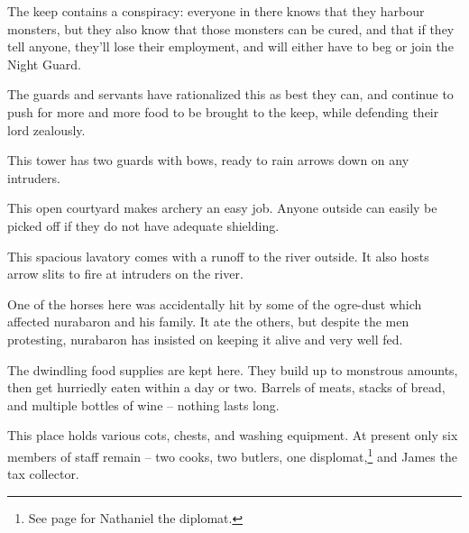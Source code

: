 \begin{multicols}{2}

\setcounter{list}{0}

The keep contains a conspiracy: everyone in there knows that they harbour monsters, but they also know that those monsters can be cured, and that if they tell anyone, they'll lose their employment, and will either have to beg or join the Night Guard.

The guards and servants have rationalized this as best they can, and continue to push for more and more food to be brought to the keep, while defending their lord zealously.


This tower has two guards with bows, ready to rain arrows down on any intruders.


\humanarcher


This open courtyard makes archery an easy job.  Anyone outside can easily be picked off if they do not have adequate shielding.


This spacious lavatory comes with a runoff to the river outside.  It also hosts arrow slits to fire at intruders on the river.


One of the horses here was accidentally hit by some of the ogre-dust which affected \gls{nurabaron} and his family.  It ate the others, but despite the men protesting, \gls{nurabaron} has insisted on keeping it alive and very well fed.


\nurahorse


The dwindling food supplies are kept here.  They build up to monstrous amounts, then get hurriedly eaten within a day or two.  Barrels of meats, stacks of bread, and multiple bottles of wine -- nothing lasts long.


This place holds various cots, chests, and washing equipment.  At present only six members of staff remain -- two cooks, two butlers, one displomat,\footnote{See page \pageref{nathaniel} for Nathaniel the diplomat.} and James the tax collector.



\end{multicols}
